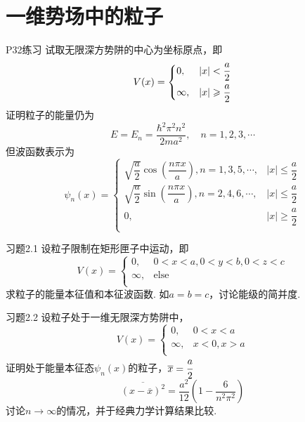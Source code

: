 \section{一维势场中的粒子}
\begin{question}{P32练习}
    试取无限深方势阱的中心为坐标原点，即
    $$
        V(x) = \begin{dcases}
            0,      & |x|<\frac{a}{2}          \\
            \infty, & |x|\geqslant \frac{a}{2} \\
        \end{dcases}
    $$
    证明粒子的能量仍为
    $$
        E = E_n = \frac{\hbar^2\pi^2n^2}{2ma^2}, \quad n=1,2,3,\cdots
    $$
    但波函数表示为
    $$
        \psi_n(x) = \begin{cases}
            \sqrt{\dfrac{a}{2}}\cos\left(\dfrac{n\pi x}{a}\right), n=1,3,5,\cdots, & |x|\leqslant\dfrac{a}{2} \\
            \sqrt{\dfrac{a}{2}}\sin\left(\dfrac{n\pi x}{a}\right), n=2,4,6,\cdots, & |x|\leqslant\dfrac{a}{2} \\
            0,                                                                     & |x|\geqslant\dfrac{a}{2} \\
        \end{cases}
    $$
\end{question}
\begin{solution}
\end{solution}




\begin{question}{习题2.1}
    设粒子限制在矩形匣子中运动，即
    $$
        V(x) = \begin{cases}
            0,      & 0<x<a, 0<y<b, 0<z<c \\
            \infty, & \text{else}         \\
        \end{cases}
    $$
    求粒子的能量本征值和本征波函数. 如$a=b=c$，讨论能级的简并度.
\end{question}
\begin{solution}
\end{solution}




\begin{question}{习题2.2}
    设粒子处于一维无限深方势阱中，
    $$
        V(x) = \begin{cases}
            0,      & 0<x<a    \\
            \infty, & x<0, x>a \\
        \end{cases}
    $$
    证明处于能量本征态$\psi_n(x)$的粒子，$\overline{x}=\cfrac{a}{2}$
    $$
        \overline{\left(x-\overline{x}\right)^2} = \frac{a^2}{12}\left(1-\frac{6}{n^2\pi^2}\right)
    $$
    讨论$n\to\infty$的情况，并于经典力学计算结果比较.
\end{question}
\begin{solution}
\end{solution}



